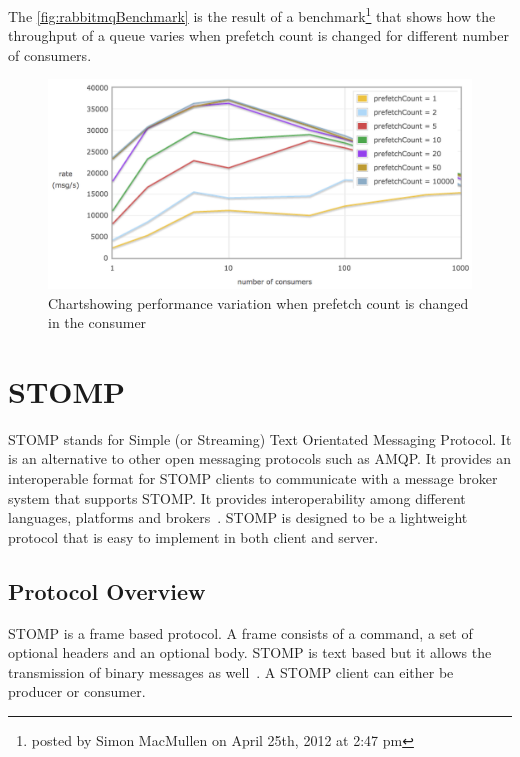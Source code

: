   The \autoref{fig:rabbitmqBenchmark} is the result of a benchmark\footnote{posted by Simon MacMullen on April 25th, 2012 at 2:47 pm} that shows how the throughput of a queue varies when prefetch count is changed for different number of consumers.
\begin{figure}[H]
  \centering
  \includegraphics[width=1\textwidth]{figures/rabbitmqPrefetch}
  \caption[Chart showing performance variation when prefetch count is changed in the consumer]{Chart\footnotemark showing performance variation when prefetch count is changed in the consumer}
  \label{fig:rabbitmqBenchmark}
\end{figure}

\section{STOMP}
\label{sec:stomp}
  STOMP stands for Simple (or Streaming) Text Orientated Messaging Protocol. It is an alternative to other open messaging protocols such as AMQP. It provides an interoperable format for STOMP clients to communicate with a message broker system that supports STOMP. It provides interoperability among different languages, platforms and brokers~\cite{stomp}.
  STOMP is designed to be a lightweight protocol that is easy to implement in both client and server.
  \subsection{Protocol Overview}
  STOMP is a frame based protocol. A frame consists of a command, a set of optional headers and an optional body. STOMP is text based but it allows the transmission of binary messages as well~\cite{stomp}. A STOMP client can either be producer or consumer.

